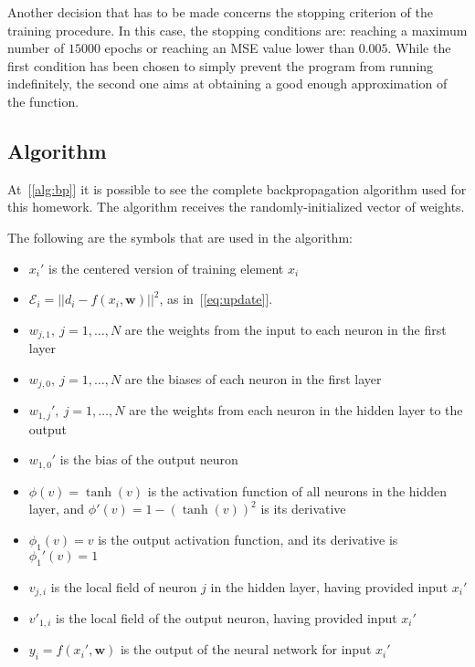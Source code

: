 \documentclass[12pt]{article}
\begin{document}
Another decision that has to be made concerns the stopping criterion of the training procedure.
In this case, the stopping conditions are: reaching a maximum number of $15000$ epochs or reaching an MSE value lower than $0.005$.
While the first condition has been chosen to simply prevent the program from running indefinitely, the second one aims at obtaining a good enough approximation of the function.

\subsection{Algorithm}

At\ [\ref{alg:bp}] it is possible to see the complete backpropagation algorithm used for this homework.
The algorithm receives the randomly-initialized vector of weights.

The following are the symbols that are used in the algorithm:
\begin{itemize}
  \item $x_i'$ is the centered version of training element $x_i$
  \item $\mathcal{E}_i = ||d_i - f(x_i, \textbf{w})||^2$, as in\ [\ref{eq:update}].
  \item $w_{j,1},\ j=1,\ldots, N$ are the weights from the input to each neuron in the first layer
  \item $w_{j,0},\ j=1,\ldots, N$ are the biases of each neuron in the first layer
  \item $w_{1, j}',\ j=1,\ldots, N$ are the weights from each neuron in the hidden layer to the output
  \item $w_{1,0}'$ is the bias of the output neuron
  \item $\phi(v) = \tanh{(v)}$ is the activation function of all neurons in the hidden layer, and $\phi'(v) = 1-{(\tanh{(v)})}^2$ is its derivative
  \item $\phi_1(v) = v$ is the output activation function, and its derivative is $\phi_1'(v)=1$
  \item $v_{j, i}$ is the local field of neuron $j$ in the hidden layer, having provided input $x_i'$
  \item $v'_{1, i}$ is the local field of the output neuron, having provided input $x_i'$
  \item $y_i = f(x_i', \textbf{w})$ is the output of the neural network for input $x_i'$
\end{itemize}
\end{document}
